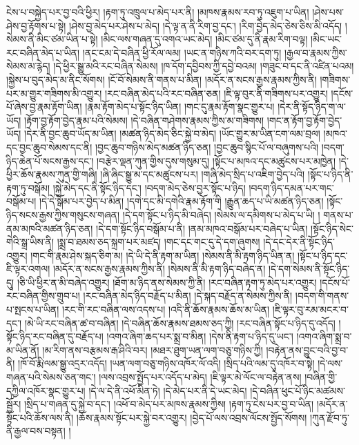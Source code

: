 ངེས་པ་བསྐྱེད་པར་བྱ་བའི་ཕྱིར། །རྟག་ཏུ་འཁྲུལ་པ་མེད་པར་ནི། །མཁས་རྣམས་རབ་ཏུ་འཇུག་པ་ཡིན། །ཤེས་པས་ཤེས་བྱ་རྟོགས་པ་སྟེ། །ཤེས་བྱ་མེད་པར་ཤེས་པ་མེད། །དེ་ལྟ་ན་ནི་རིག་བྱ་དང་། །རིག་བྱེད་མེད་ཅེས་ཅིས་མི་འདོད། །སེམས་ནི་མིང་ཙམ་ཡིན་པ་སྟེ། །མིང་ལས་གཞན་དུ་འགའ་ཡང་མེད། །མིང་ཙམ་དུ་ནི་རྣམ་རིག་བལྟ། །མིང་ཡང་རང་བཞིན་མེད་པ་ཡིན། །ནང་ངམ་དེ་བཞིན་ཕྱི་རོལ་ལམ། །ཡང་ན་གཉིས་ཀའི་བར་དག་ཏུ། །རྒྱལ་བ་རྣམས་ཀྱིས་སེམས་མ་རྙེད། །དེ་ཕྱིར་སྒྱུ་མའི་རང་བཞིན་སེམས། །ཁ་དོག་དབྱིབས་ཀྱི་དབྱེ་བའམ། །གཟུང་བ་དང་ནི་འཛིན་པའམ། །སྐྱེས་པ་བུད་མེད་མ་ནིང་སོགས། །ངོ་བོ་སེམས་ནི་གནས་པ་མིན། །མདོར་ན་སངས་རྒྱས་རྣམས་ཀྱིས་ནི། །གཟིགས་པར་མ་གྱུར་གཟིགས་མི་འགྱུར། །རང་བཞིན་མེད་པའི་རང་བཞིན་ཅན། །ཇི་ལྟ་བུར་ནི་གཟིགས་པར་འགྱུར། །དངོས་པོ་ཞེས་བྱ་རྣམ་རྟོག་ཡིན། །རྣམ་རྟོག་མེད་པ་སྟོང་ཉིད་ཡིན། །གང་དུ་རྣམ་རྟོག་སྣང་གྱུར་པ། །དེར་ནི་སྟོད་ཉིད་ག་ལ་ཡོད། །རྟོག་བྱ་རྟོག་བྱེད་རྣམ་པའི་སེམས། །དེ་བཞིན་གཤེགས་རྣམས་ཀྱིས་མ་གཟིགས། །གང་ན་རྟོག་བྱ་རྟོག་བྱེད་ཡོད། །དེར་ནི་བྱང་ཆུབ་ཡོད་མ་ཡིན། །མཚན་ཉིད་མེད་ཅིང་སྐྱེ་བ་མེད། །ཡོང་གྱུར་མ་ཡིན་ངག་ལམ་བྲལ། །མཁའ་དང་བྱང་ཆུབ་སེམས་དང་ནི། །བྱང་ཆུབ་གཉིས་མེད་མཚན་ཉིད་ཅན། །བྱང་ཆུབ་སྙིང་པོ་ལ་བཞུགས་པའི། །བདག་ཉིད་ཆེན་པོ་སངས་རྒྱས་དང་། །བརྩེར་ལྡན་ཀུན་གྱིས་དུས་གསུམ་དུ། །སྟོང་པ་མཁའ་དང་མཚུངས་པར་མཁྱེན། །དེ་ཕྱིར་ཆོས་རྣམས་ཀུན་གྱི་གཞི། །ཞི་ཞིང་སྒྱུ་མ་དང་མཚུངས་པར། །གཞི་མེད་སྲིད་པ་འཇིག་བྱེད་པའི། །སྟོང་པ་ཉིད་ནི་རྟག་ཏུ་བསྒོམ། །སྐྱེ་མེད་དང་ནི་སྟོང་ཉིད་དང་། །བདག་མེད་ཅེས་བྱར་སྟོང་པ་ཉིད། །བདག་ཉིད་དམན་པར་གང་བསྒོམ་པ། །དེ་དེ་སྒོམ་པར་བྱེད་པ་མིན། །དགེ་དང་མི་དགེའི་རྣམ་རྟོག་གི །རྒྱུན་ཆད་པ་ཡི་མཚན་ཉིད་ཅན། །སྟོང་ཉིད་སངས་རྒྱས་ཀྱིས་གསུངས་གཞན། །དེ་དག་སྟོང་པ་ཉིད་མི་བཞེད། །སེམས་ལ་དམིགས་པ་མེད་པ་ཡི། །
གནས་པ་ནམ་མཁའི་མཚན་ཉིད་ཅན། །དེ་དག་སྟོང་ཉིད་བསྒོམ་པ་ནི། །ནམ་མཁའ་བསྒོམ་པར་བཞེད་པ་ཡིན། །སྟོང་ཉིད་སེང་གེའི་སྒྲ་ཡིས་ནི། །སྨྲ་བ་ཐམས་ཅད་སྐྲག་པར་མཛད། །གང་དང་གང་དུ་དེ་དག་ཞུགས། །དེ་དང་དེར་ནི་སྟོང་ཉིད་འགྱུར། །གང་གི་རྣམ་ཤེས་སྐད་ཅིག་མ། །དེ་ཡི་དེ་ནི་རྟག་མ་ཡིན། །སེམས་ནི་མི་རྟག་ཉིད་ཡིན་ན། །སྟོང་པ་ཉིད་དང་ཇི་ལྟར་འགལ། །མདོར་ན་སངས་རྒྱས་རྣམས་ཀྱིས་ནི། །སེམས་ནི་མི་རྟག་ཉིད་བཞེད་ན། །དེ་དག་སེམས་ནི་སྟོང་ཉིད་དུ། །ཅི་ཡི་ཕྱིར་ན་མི་བཞེད་འགྱུར། །ཐོག་མ་ཉིད་ནས་སེམས་ཀྱི་ནི། །རང་བཞིན་རྟག་ཏུ་མེད་པར་འགྱུར། །དངོས་པོ་རང་བཞིན་གྱིས་གྲུབ་པ། །རང་བཞིན་མེད་ཉིད་བརྗོད་པ་མིན། །དེ་སྐད་བརྗོད་ན་སེམས་ཀྱིས་ནི། །བདག་གི་གནས་པ་སྤངས་པ་ཡིན། །རང་གི་རང་བཞིན་ལས་འདས་པ། །འདི་ནི་ཆོས་རྣམས་ཆོས་མ་ཡིན། །ཇི་ལྟར་བུ་རམ་མངར་བ་དང་། །མེ་ཡི་རང་བཞིན་ཚ་བ་བཞིན། །དེ་བཞིན་ཆོས་རྣམས་ཐམས་ཅད་ཀྱི། །རང་བཞིན་སྟོང་པ་ཉིད་དུ་འདོད། །སྟོང་ཉིད་རང་བཞིན་དུ་བརྗོད་པ། །འགའ་ཞིག་ཆད་པར་སྨྲ་བ་མིན། །དེས་ནི་རྟག་པ་ཉིད་དུ་ཡང་། །འགའ་ཞིག་སྨྲ་བ་མ་ཡིན་ནོ། །མ་རིག་ནས་བརྩམས་རྒ་ཤིའི་བར། །མཐར་ཐུག་ཡན་ལག་བཅུ་གཉིས་ཀྱི། །བརྟེན་ནས་བྱུང་བའི་བྱ་བ་ནི། །ཁོ་བོ་རྨི་ལམ་སྒྱུ་འདྲར་འདོད། །ཡན་ལག་བཅུ་གཉིས་འཁོར་ལོ་འདི། །སྲིད་པའི་ལམ་དུ་འཁོར་བ་སྟེ། །དེ་ལས་གཞན་པའི་སེམས་ཅན་གང་། །ལས་འབྲས་སྤྱོད་པར་འདོད་པ་མེད། །ཇི་ལྟར་མེ་ལོང་ལ་བརྟེན་ནས། །བཞིན་གྱི་དཀྱིལ་འཁོར་སྣང་གྱུར་པ། །དེ་ལ་དེ་ནི་འཕོ་མིན་ཏེ། །དེ་མེད་པར་ནི་དེ་ཡང་མེད། །དེ་བཞིན་ཕུང་པོ་ཉིང་མཚམས་སྦྱོར། །སྲིད་པ་གཞན་དུ་སྐྱེ་བ་དང་། །འཕོ་བ་མེད་པར་མཁས་རྣམས་ཀྱིས། །རྟག་ཏུ་ངེས་པར་བྱ་བ་ཡིན། །མདོར་ན་སྟོང་པའི་ཆོས་ལས་ནི། །ཆོས་རྣམས་སྟོང་པར་སྐྱེ་བར་འགྱུར། །བྱེད་པོ་ལས་འབྲས་ལོངས་སྤྱོད་སོགས། །ཀུན་རྫོབ་ཏུ་ནི་རྒྱལ་བས་བསྟན། །
